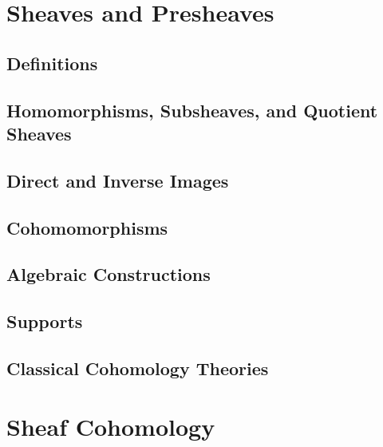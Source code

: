 \documentclass[11pt, a4paper]{article}
\title{\notestitle}
\author{\notesauthor}
\date{\notesdate}
\begin{document}
\maketitle
\tableofcontents
\newpage

\section{Sheaves and Presheaves}

\subsection{Definitions}

\subsection{Homomorphisms, Subsheaves, and Quotient Sheaves}

\subsection{Direct and Inverse Images}

\subsection{Cohomomorphisms}

\subsection{Algebraic Constructions}

\subsection{Supports}

\subsection{Classical Cohomology Theories}

\section{Sheaf Cohomology}
\end{document}
